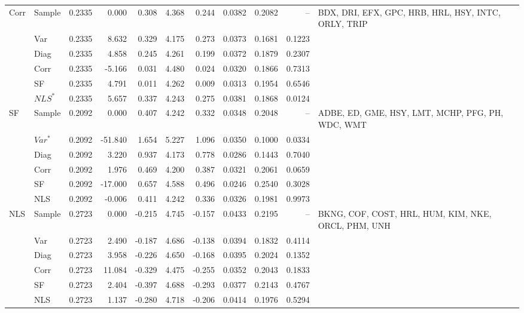 \begin{table}
{\begin{tabular}{llrrrrrrrrp{7.3cm}}
			Corr & Sample & 0.2335 & 0.000 & 0.308 & 4.368 & 0.244 & 0.0382 & 0.2082 & -- & BDX, DRI, EFX, GPC, HRB, HRL, HSY, INTC, ORLY, TRIP \\
			& Var & 0.2335 & 8.632 & 0.329 & 4.175 & 0.273 & 0.0373 & 0.1681 & 0.1223 & \\
			& Diag & 0.2335 & 4.858 & 0.245 & 4.261 & 0.199 & 0.0372 & 0.1879 & 0.2307 & \\
			& Corr & 0.2335 & -5.166 & 0.031 & 4.480 & 0.024 & 0.0320 & 0.1866 & 0.7313 & \\
			& SF & 0.2335 & 4.791 & 0.011 & 4.262 & 0.009 & 0.0313 & 0.1954 & 0.6546 & \\
			& $NLS^{*}$ & 0.2335 & 5.657 & 0.337 & 4.243 & 0.275 & 0.0381 & 0.1868 & 0.0124 & \\
			\midrule
			
			SF & Sample & 0.2092 & 0.000 & 0.407 & 4.242 & 0.332 & 0.0348 & 0.2048 & -- & ADBE, ED, GME, HSY, LMT, MCHP, PFG, PH, WDC, WMT \\
			& $Var^{*}$ & 0.2092 & -51.840 & 1.654 & 5.227 & 1.096 & 0.0350 & 0.1000 & 0.0334 & \\
			& Diag & 0.2092 & 3.220 & 0.937 & 4.173 & 0.778 & 0.0286 & 0.1443 & 0.7040 & \\
			& Corr & 0.2092 & 1.976 & 0.469 & 4.200 & 0.387 & 0.0321 & 0.2061 & 0.0659 & \\
			& SF & 0.2092 & -17.000 & 0.657 & 4.588 & 0.496 & 0.0246 & 0.2540 & 0.3028 & \\
			& NLS & 0.2092 & -0.006 & 0.411 & 4.242 & 0.336 & 0.0326 & 0.1981 & 0.9973 & \\
			\midrule
			
			NLS & Sample & 0.2723 & 0.000 & -0.215 & 4.745 & -0.157 & 0.0433 & 0.2195 & -- & BKNG, COF, COST, HRL, HUM, KIM, NKE, ORCL, PHM, UNH \\
			& Var & 0.2723 & 2.490 & -0.187 & 4.686 & -0.138 & 0.0394 & 0.1832 & 0.4114 & \\
			& Diag & 0.2723 & 3.958 & -0.226 & 4.650 & -0.168 & 0.0395 & 0.2024 & 0.1352 & \\
			& Corr & 0.2723 & 11.084 & -0.329 & 4.475 & -0.255 & 0.0352 & 0.2043 & 0.1833 & \\
			& SF & 0.2723 & 2.404 & -0.397 & 4.688 & -0.293 & 0.0377 & 0.2143 & 0.4767 & \\
			& NLS & 0.2723 & 1.137 & -0.280 & 4.718 & -0.206 & 0.0414 & 0.1976 & 0.5294 & \\
			\bottomrule
		\end{tabular}%
	}
	

\end{table}
